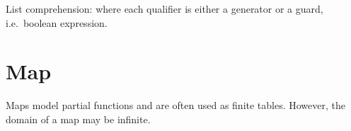 \begin{isabellebody}
\begin{isamarkuptext}
List comprehension:  where each
qualifier  is either a generator \mbox{} or a
guard, i.e.\ boolean expression.

\section{Map}

Maps model partial functions and are often used as finite tables. However,
the domain of a map may be infinite.


\end{isamarkuptext}
\end{isabellebody}
